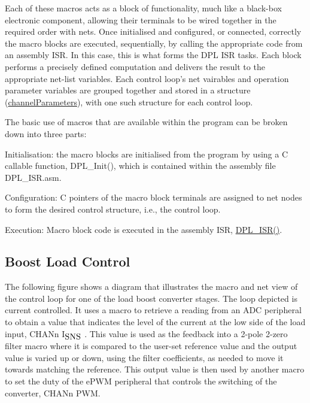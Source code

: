 Each of these macros acts as a block of functionality, much like a black-\/box electronic component, allowing their terminals to be wired together in the required order with nets. Once initialised and configured, or connected, correctly the macro blocks are executed, sequentially, by calling the appropriate code from an assembly I\-S\-R. In this case, this is what forms the D\-P\-L I\-S\-R tasks. Each block performs a precisely defined computation and delivers the result to the appropriate net-\/list variables. Each control loop's net vairables and operation parameter variables are grouped together and stored in a structure (\hyperlink{a00003}{channel\-Parameters}), with one such structure for each control loop.

The basic use of macros that are available within the program can be broken down into three parts\-:
\begin{DoxyEnumerate}
\item Initialisation\-: the macro blocks are initialised from the program by using a C callable function, D\-P\-L\-\_\-\-Init(), which is contained within the assembly file D\-P\-L\-\_\-\-I\-S\-R.\-asm.
\item Configuration\-: C pointers of the macro block terminals are assigned to net nodes to form the desired control structure, i.\-e., the control loop.
\item Execution\-: Macro block code is executed in the assembly I\-S\-R, \hyperlink{a00026_a5532a53363218854b0e4b15049d773f7}{D\-P\-L\-\_\-\-I\-S\-R()}.
\end{DoxyEnumerate}\hypertarget{index_blctrl}{}\subsection{Boost Load Control}\label{index_blctrl}
The following figure shows a diagram that illustrates the macro and net view of the control loop for one of the load boost converter stages. The loop depicted is current controlled. It uses a macro to retrieve a reading from an A\-D\-C peripheral to obtain a value that indicates the level of the current at the low side of the load input, C\-H\-A\-Nn I$_{\mbox{S\-N\-S}}$ . This value is used as the feedback into a 2-\/pole 2-\/zero filter macro where it is compared to the user-\/set reference value and the output value is varied up or down, using the filter coefficients, as needed to move it towards matching the reference. This output value is then used by another macro to set the duty of the e\-P\-W\-M peripheral that controls the switching of the converter, C\-H\-A\-Nn P\-W\-M.

